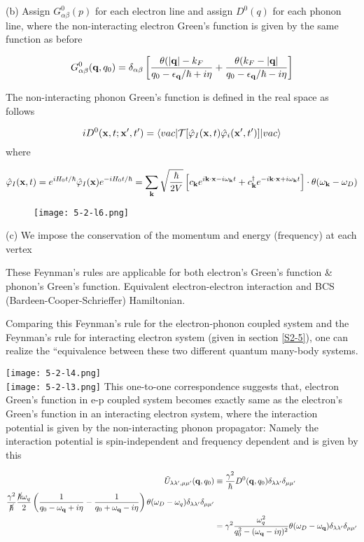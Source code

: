 \noindent (b) Assign $G_{\alpha\beta}^0(p)$ for each electron line and assign $D^0(q)$ for each phonon line, where the non-interacting electron Green's function is given by the same function as before

\[G_{\alpha\beta}^0({\bf q},q_0) = \delta_{\alpha\beta}\left[\frac{\theta(|{\bf q}|-k_F}{q_0-\epsilon_{\bf q}/\hbar+i\eta} + \frac{\theta(k_F - |{\bf q}|}{q_0-\epsilon_{\bf q}/\hbar-i\eta}\right] \]

The non-interacting phonon Green's function is defined in the real space as follows 

\[iD^0({\bf x},t;{\bf x'},t') = \langle vac|\mathcal{T}[\hat\varphi_I({\bf x},t)\hat\varphi_i({\bf x'},t')]|vac\rangle \]
where

\[\hat\varphi_I({\bf x},t) = e^{iH_0t/\hbar}\hat\varphi_I({\bf x})e^{-iH_0t/\hbar} = \sum_{\bf k}\sqrt{\frac{\hbar}{2V}}\left[c_{\bf k}e^{i{\bf k\cdot x} - i\omega_{\bf k}t} + c_{\bf k}^\dagger e^{-i{\bf k\cdot x} + i\omega_{\bf k}t}\right] \cdot\theta(\omega_{\bf k} - \omega_D)\]


\begin{wrapfigure}{l}{3cm}
\texttt{[image: 5-2-l6.png]}
\end{wrapfigure}
\noindent (c) We impose the conservation of the momentum and energy (frequency) at each vertex

These Feynman's rules are applicable for both electron's Green's function \& phonon's Green's function. Equivalent electron-electron interaction and BCS (Bardeen-Cooper-Schrieffer) Hamiltonian. 

Comparing this Feynman's rule for the electron-phonon coupled system and the Feynman's rule for interacting electron system (given in section \ref{S2-5}), one can realize the ``equivalence between these two different quantum many-body systems. 

\newpage
\texttt{[image: 5-2-l4.png]}\\
\texttt{[image: 5-2-l3.png]}
\newpage
This one-to-one correspondence suggests that, electron Green's function in e-p coupled system becomes exactly same as the electron's Green's function in an interacting electron system, where the interaction potential is given by the non-interacting phonon propagator: Namely the interaction potential is spin-independent and frequency dependent and is given by this

\[\begin{split}
\tilde{U}_{\lambda\lambda',\mu\mu'}({\bf q},q_0)&\equiv\frac{\gamma^2}{\hbar}D^0({\bf q},q_0)\delta_{\lambda\lambda'}\delta_{\mu\mu'}\\
\frac{\gamma^2}{\cancel\hbar}\frac{\cancel{\hbar}\omega_q}{2}\left(\frac{1}{q_0-\omega_{\bf q}+i\eta} - \frac{1}{q_0+\omega_{\bf q}-i\eta}\right)\theta(\omega_D-\omega_q)\delta_{\lambda\lambda'}\delta_{\mu\mu'}\\
&=\gamma^2\frac{\omega_q^2}{q_0^2-(\omega_{\bf q}-i\eta)^2}\theta(\omega_D-\omega_{\bf q})\delta_{\lambda\lambda'}\delta_{\mu\mu'}
\end{split} \]

